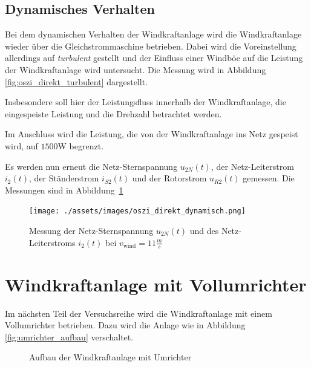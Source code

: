 \documentclass{report}
\begin{document}
\subsection{Dynamisches Verhalten}

Bei dem dynamischen Verhalten der Windkraftanlage wird die Windkraftanlage wieder über die Gleichstrommaschine betrieben. Dabei wird die Voreinstellung allerdings auf \textit{turbulent} gestellt und der Einfluss einer Windböe auf die Leistung der Windkraftanlage wird untersucht. Die Messung wird in Abbildung \ref{fig:oszi_direkt_turbulent} dargestellt.


Insbesondere soll hier der Leistungsfluss innerhalb der Windkraftanlage, die eingespeiste Leistung und die Drehzahl betrachtet werden.


Im Anschluss wird die Leistung, die von der Windkraftanlage ins Netz gespeist wird, auf $1500$W begrenzt.


Es werden nun erneut die Netz-Sternspannung $u_{2N}(t)$, der Netz-Leiterstrom $i_{2}(t)$, der Ständerstrom $i_{S2}(t)$ und der Rotorstrom $u_{R2}(t)$ gemessen. Die Messungen sind in Abbildung~\ref{fig:oszi_direkt_dynamisch}

\begin{figure}[!ht]
	\centering
	\texttt{[image: ./assets/images/oszi\_direkt\_dynamisch.png]}
	\caption{Messung der Netz-Sternspannung $u_{2N}(t)$ und des Netz-Leiterstroms $i_{2}(t)$ bei $v_{\mathrm{wind}} = 11 \frac{m}{s}$}
	\label{fig:oszi_direkt_dynamisch}
\end{figure}

\section{Windkraftanlage mit Vollumrichter}

Im nächsten Teil der Versuchsreihe wird die Windkraftanlage mit einem Vollumrichter betrieben. Dazu wird die Anlage wie in Abbildung \ref{fig:umrichter_aufbau} verschaltet.


\begin{figure}[!ht]
  \centering

  \caption{Aufbau der Windkraftanlage mit Umrichter}
  \label{fig:aufbau_umrichter}
\end{figure}
\end{document}
